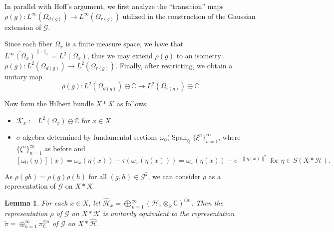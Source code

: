 \documentclass[a4paper,11pt]{article}
\numberwithin{equation}{section}
\newtheorem{lem}[thm]{Lemma}
\theoremstyle{definition}
\theoremstyle{remark}
\newtheorem{rem}[thm]{Remark}
\numberwithin{equation}{section}
\newcommand{\rG}{\mathcal{G}}
\newcommand{\C}{\mathbb{C}}
\newcommand{\Q}{\mathbb{Q}}
\def\H{\mathcal H}
\def\K{\mathcal K}
\def\R{\mathbb{R}}
\DeclareMathOperator{\Span}{Span}
\providecommand{\norm}[1]{\lVert#1\rVert}
\newcommand*\cls[1]{\overline{#1}}
\numberwithin{equation}{section}
\begin{document}


In parallel with Hoff's argument, we first analyze the ``transition'' maps $ \rho(g):L^{\infty}(\Omega_{d(g)}) \to L^{\infty}(\Omega_{r(g)}) $ utilized in the construction of the Gaussian extension of $ \rG $.

Since each fiber $ \Omega_{x} $ is a finite measure space, we have that $ \cls{L^{\infty}(\Omega_{x})}^{\norm{\cdot}_{2}} = L^{2}(\Omega_{x}) $, thus we may extend $ \rho(g) $ to an isometry $ \rho(g):L^{2}(\Omega_{d(g)})\to L^{2}(\Omega_{r(g)}) $. Finally, after restricting, we obtain a unitary map
$$
  \rho(g): L^{2}(\Omega_{d(g)})\ominus \C \to L^{2}(\Omega_{r(g)})\ominus \C
$$

Now form the Hilbert bundle $ X\ast \K $ as follows
\begin{itemize}
  \item $ \K_{x}:=L^{2}(\Omega_{x})\ominus \C $ for $ x\in X $
  \item $ \sigma $-algebra determined by fundamental sections $ \omega_{0}(\Span_{\Q}\{\xi^{n}\}_{n=1}^{\infty} $, where $ \{\xi^{n}\}_{n=1}^{\infty} $ as before and 
    $$
    [\omega_{0}(\eta)](x) = \omega_{x}(\eta(x)) - \tau(\omega_{x}(\eta(x))) = \omega_{x}(\eta(x)) - e^{-\norm{\eta(x)}^{2}} \text{ for }\eta\in S(X\ast\H).
    $$
\end{itemize}

As $ \rho(gh) = \rho(g) \rho(h) $ for all $ (g,h)\in \rG^{2} $, we can consider $ \rho $ as a representation of $ \rG $ on $ X\ast \K $


\begin{lem}\label{fockspace}
  For each $ x\in X $, let $ \widehat{\H}_{x} = \bigoplus_{n=1}^{\infty}(\H_{x}\otimes_{\R}\C)^{\odot n} $. Then the representation $ \rho $ of $ \rG $ on $ X\ast \K $ is unitarily equivalent to the representation $ \widetilde{\pi} = \oplus_{n=1}^{\infty} \pi_{\C}^{\odot n} $ of $ \rG $ on $ X\ast \widehat{\H} $.
\end{lem}
\end{document}
